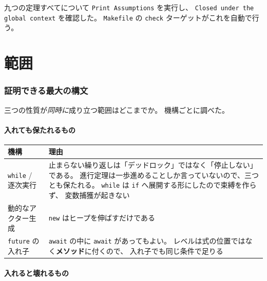\documentclass[11pt,a4paper]{ltjsarticle}
\theoremstyle{definition}
\theoremstyle{remark}
\begin{document}
九つの定理すべてについて \texttt{Print Assumptions} を実行し、
\texttt{Closed under the global context} を確認した。
\texttt{Makefile} の \texttt{check} ターゲットがこれを自動で行う。

\part{範囲}
\label{part:scope}

\section{証明できる最大の構文}
\label{sec:max}

三つの性質が\emph{同時に}成り立つ範囲はどこまでか。
機構ごとに調べた。

\subsection{入れても保たれるもの}

\begin{center}
\small
\begin{tabular}{@{}lp{8.6cm}@{}}
\toprule
機構 & 理由 \\
\midrule
\texttt{while} / 逐次実行 &
  止まらない繰り返しは「デッドロック」ではなく「停止しない」である。
  進行定理は一歩進めることしか言っていないので、三つとも保たれる。
  \texttt{while} は \texttt{if} へ展開する形にしたので束縛を作らず、
  変数捕獲が起きない \\
動的なアクター生成 & \texttt{new} はヒープを伸ばすだけである \\
\texttt{future} の入れ子 &
  \texttt{await} の中に \texttt{await} があってもよい。
  レベルは式の位置ではなく\textbf{メソッド}に付くので、
  入れ子でも同じ条件で足りる \\
\bottomrule
\end{tabular}
\end{center}

\subsection{入れると壊れるもの}
\end{document}
